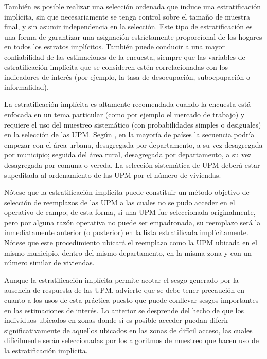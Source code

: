 \documentclass[
  12pt,
]{book}
\begin{document}
También es posible realizar una selección ordenada que induce una estratificación implícita, sin que necesariamente se tenga control sobre el tamaño de muestra final, y sin asumir independencia en la selección. Este tipo de estratificación es una forma de garantizar una asignación estrictamente proporcional de los hogares en todos los estratos implícitos. También puede conducir a una mayor confiabilidad de las estimaciones de la encuesta, siempre que las variables de estratificación implícita que se consideren estén correlacionadas con los indicadores de interés (por ejemplo, la tasa de desocupación, subocpupación o informalidad).

La estratificación implícita es altamente recomendada cuando la encuesta está enfocada en un tema particular (como por ejemplo el mercado de trabajo) y requiere el uso del muestreo sistemático (con probabilidades simples o desiguales) en la selección de las UPM. Según \citet[pág. 46]{UN_2008}, en la mayoría de países la secuencia podría empezar con el área urbana, desagregada por departamento, a su vez desagregada por municipio; seguida del área rural, desagregada por departamento, a su vez desagregada por comuna o vereda. La selección sistemática de UPM deberá estar supeditada al ordenamiento de las UPM por el número de viviendas.

Nótese que la estratificación implícita puede constituir un método objetivo de selección de reemplazos de las UPM a las cuales no se pudo acceder en el operativo de campo; de esta forma, si una UPM fue seleccionada originalmente, pero por alguna razón operativa no puede ser empadronada, su reemplazo será la inmediatamente anterior (o posterior) en la lista estratificada implícitamente. Nótese que este procedimiento ubicará el reemplazo como la UPM ubicada en el mismo municipio, dentro del mismo departamento, en la misma zona y con un número similar de viviendas.

Aunque la estratificación implícita permite acotar el sesgo generado por la ausencia de respuesta de las UPM, \citet[págs. 348 - 349]{Vehovar_1999} advierte que se debe tener precaución en cuanto a los usos de esta práctica puesto que puede conllevar sesgos importantes en las estimaciones de interés. Lo anterior se desprende del hecho de que los individuos ubicados en zonas donde sí es posible acceder puedan diferir significativamente de aquellos ubicados en las zonas de difícil acceso, las cuales difícilmente serán seleccionadas por los algoritmos de muestreo que hacen uso de la estratificación implícita.
\end{document}
